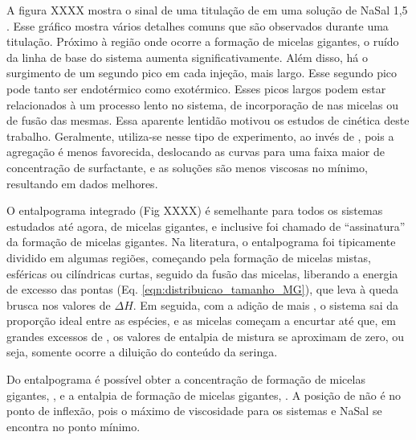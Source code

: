 		
		A figura XXXX mostra o sinal de uma titulação de \TTAB{} em uma solução de NaSal 1,5 \mM{}. Esse gráfico mostra vários detalhes comuns que são observados durante uma titulação. Próximo à região onde ocorre a formação de micelas gigantes, o ruído da linha de base do sistema aumenta significativamente. Além disso, há o surgimento de um segundo pico em cada injeção, mais largo. Esse segundo pico pode tanto ser endotérmico como exotérmico. Esses picos largos podem estar relacionados à um processo lento no sistema, de incorporação de \Sal{} nas micelas ou de fusão das mesmas. Essa aparente lentidão motivou os estudos de cinética deste trabalho. %
		Geralmente, utiliza-se \TTAB{} nesse tipo de experimento, ao invés de \CTAB{}, pois a agregação é menos favorecida, deslocando as curvas para uma faixa maior de concentração de surfactante, e as soluções são menos viscosas no mínimo, resultando em dados melhores.
		
		
		
		O entalpograma integrado (Fig XXXX) é semelhante para todos os sistemas estudados até agora, de micelas gigantes, e inclusive foi chamado de ``assinatura'' da formação de micelas gigantes. %
		Na literatura, o entalpograma foi tipicamente dividido em algumas regiões, começando pela formação de micelas mistas, esféricas ou cilíndricas curtas, seguido da fusão das micelas, liberando a energia de excesso das pontas (Eq. \ref{eqn:distribuicao_tamanho_MG}), que leva à queda brusca nos valores de \(\Delta H\). Em seguida, com a adição de mais \TTAB, o sistema sai da proporção ideal entre as espécies, e as micelas começam a encurtar até que, em grandes excessos de \TTAB, os valores de entalpia de mistura se aproximam de zero, ou seja, somente ocorre a diluição do conteúdo da seringa.
		
		Do entalpograma é possível obter a concentração de formação de micelas gigantes, \cwlm, e a entalpia de formação de micelas gigantes, \DHwlm. A posição de \cwlm{} não é no ponto de inflexão, pois o máximo de viscosidade para os sistemas \TTAB{} e NaSal se encontra no ponto mínimo. %
		

